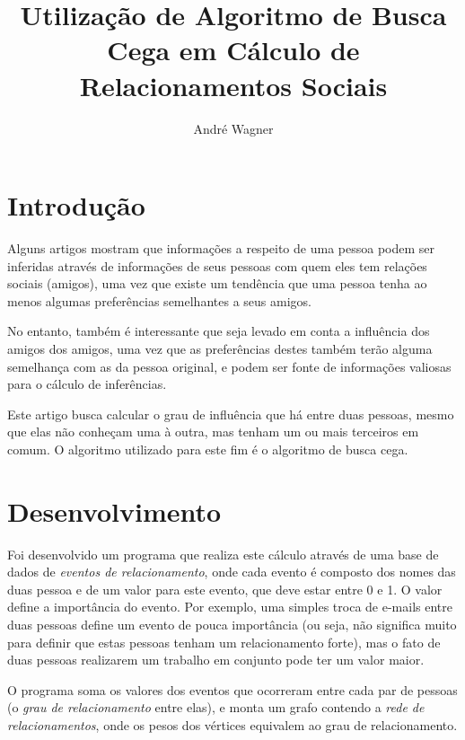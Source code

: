 \documentclass[a4paper, twocolumn, 12pt]{article}
\author{André Wagner}
\title{Utilização de Algoritmo de Busca Cega em Cálculo de Relacionamentos Sociais}
\begin{document}
\maketitle


\section{Introdução}

Alguns artigos \cite{park,lazarsfeld1954fsp} mostram que informações a respeito de uma pessoa podem ser inferidas através de informações de seus pessoas com quem eles tem relações sociais (amigos), uma vez que existe um tendência que uma pessoa tenha ao menos algumas preferências semelhantes a seus amigos.

No entanto, também é interessante que seja levado em conta a influência dos amigos dos amigos, uma vez que as preferências destes também terão alguma semelhança com as da pessoa original,  e podem ser fonte de informações valiosas para o cálculo de inferências.

Este artigo busca calcular o grau de influência que há entre duas pessoas, mesmo que elas não conheçam uma à outra, mas tenham um ou mais terceiros em comum. O algoritmo utilizado para este fim é o algoritmo de busca cega.


\section{Desenvolvimento}

Foi desenvolvido um programa que realiza este cálculo através de uma base de dados de \emph{eventos de relacionamento}, onde cada evento é composto dos nomes das duas pessoa e de um valor para este evento, que deve estar entre 0 e 1. O valor define a importância do evento. Por exemplo, uma simples troca de e-mails entre duas pessoas define um evento de pouca importância (ou seja, não significa muito para definir que estas pessoas tenham um relacionamento forte), mas o fato de duas pessoas realizarem um trabalho em conjunto pode ter um valor maior.

O programa soma os valores dos eventos que ocorreram entre cada par de pessoas (o \emph{grau de relacionamento} entre elas), e monta um grafo contendo a \emph{rede de relacionamentos}, onde os pesos dos vértices equivalem ao grau de relacionamento.
\end{document}
